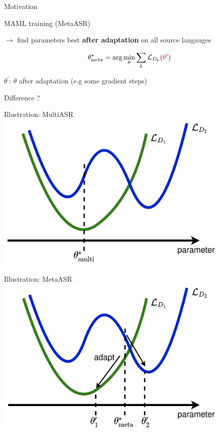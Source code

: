 \documentclass{beamer}
\begin{document}
\begin{frame}[t]{Motivation}
	\begin{center}
    \LARGE{MAML training (MetaASR)}
	\end{center}
  \vspace{3em}
  $\rightarrow$ find parameters best \textbf{after adaptation} on all source langauges

  \begin{equation*}
    \theta_{\text{meta}}^\star = \arg \min_\theta \sum_k \mathcal{L}_{D_k}(\textcolor{red}{\theta^\prime})
  \end{equation*}

  $\theta^\prime$: $\theta$ after adaptation (e.g some gradient steps) \\
  \flushright \hyperlink{overview of maml}{}
\end{frame}

\begin{frame}
	\begin{center}
    \LARGE{Difference ?}
	\end{center}
\end{frame}

\begin{frame}[t]{Illustration: MultiASR}
  \center \includegraphics[width=0.85\textwidth]{fig/multi_illustration.png}
\end{frame}

\begin{frame}[t]{Illustration: MetaASR}
  \center \includegraphics[width=0.85\textwidth]{fig/meta_illustration.png} 
\end{frame}
\end{document}
